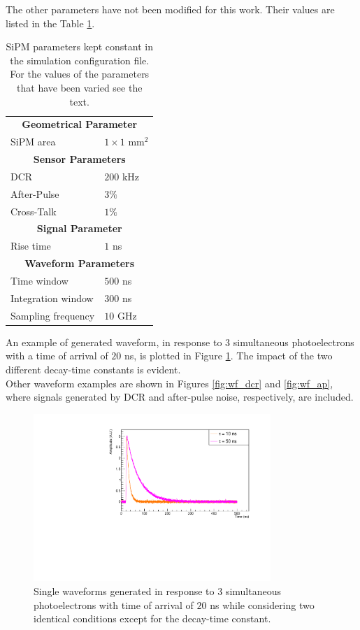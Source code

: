 The other parameters have not been modified for this work. Their values are listed in the Table \ref{tab:SiPM_par}.\\

\begin{table}
	\centering
	\setlength{\tabcolsep}{18pt}
	\begin{tabular}{ll}
		\toprule
		\multicolumn{2}{c}{\textbf{Geometrical Parameter}}	\\
		SiPM area	& $1 \times 1$ mm$^2$	\\
		\midrule
		\multicolumn{2}{c}{\textbf{Sensor Parameters}}	\\
		DCR			& $200$ kHz	\\
		After-Pulse	& $3\% $	\\
		Cross-Talk	& $1\% $	\\
		\midrule
		\multicolumn{2}{c}{\textbf{Signal Parameter}}	\\
		Rise time	& $1$ ns	\\
		\midrule
		\multicolumn{2}{c}{\textbf{Waveform Parameters}}	\\
		Time window	& $500$ ns	\\
		Integration window	& $300$ ns	\\
		Sampling frequency	& $10$ GHz	\\
		\bottomrule
	\end{tabular}
	\caption{SiPM parameters kept constant in the simulation configuration file. For the values of the parameters that have been varied see the text.}
	\label{tab:SiPM_par}
\end{table}

An example of generated waveform, in response to $3$ simultaneous photoelectrons with a time of arrival of $20$ ns, is plotted in Figure \ref{fig:diff_wf}. The impact of the two different decay-time constants is evident.\\
Other waveform examples are shown in Figures \ref{fig:wf_dcr} and \ref{fig:wf_ap}, where signals generated by DCR and after-pulse noise, respectively, are included.\\

\begin{figure}
	\centering
	\includegraphics[width=0.8\textwidth]{IMG/Cap5/wf_different_conf}
	\caption{Single waveforms generated in response to $3$ simultaneous photoelectrons with time of arrival of $20$ ns while considering two identical conditions except for the decay-time constant.}
	\label{fig:diff_wf}
\end{figure}

